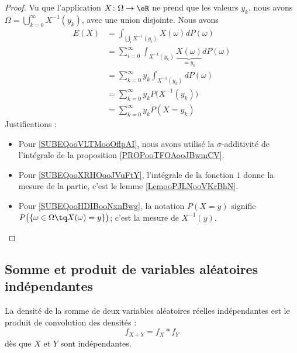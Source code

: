 \begin{proof}
	Vu que l'application \( X\colon \Omega\to \eR\) ne prend que les valeurs \( y_k\), nous avons \( \Omega=\bigcup_{k=0}^{\infty}X^{-1}(y_k)\), avec une union disjointe. Nous avons
	\begin{subequations}
		\begin{align}
			E(X) & =\int_{\bigcup_iX^{-1}(y_i)}X(\omega)dP(\omega)                                                                \\
			     & =\sum_{i=0}^{\infty}\int_{X^{-1}(y_k)}\underbrace{X(\omega)}_{=y_k}dP(\omega)      \label{SUBEQooVLTMooOflpAI} \\
			     & =\sum_{k=0}^{\infty}y_k\int_{X^{-1}(y_k)}dP(\omega)                                                            \\
			     & =\sum_{k=0}^{\infty}y_kP\big( X^{-1}(y_k) \big)        \label{SUBEQooXRHOooJVuFtY}                             \\
			     & =\sum_{k=0}^{\infty}y_kP(X=y_k)        \label{SUBEQooHDIBooNxnBwg}
		\end{align}
	\end{subequations}
	Justifications :
	\begin{itemize}
		\item
		      Pour \eqref{SUBEQooVLTMooOflpAI}, nous avons utilisé la \( \sigma\)-additivité de l'intégrale de la proposition \ref{PROPooTFOAooJBwmCV}.
		\item
		      Pour \eqref{SUBEQooXRHOooJVuFtY}, l'intégrale de la fonction \( 1\) donne la mesure de la partie, c'est le lemme \ref{LemooPJLNooVKrBhN}.
		\item
		      Pour \eqref{SUBEQooHDIBooNxnBwg}, la notation \( P(X=y)\) signifie \( P\big( \{ \omega\in \Omega \tq X(\omega)=y\}\big)\); c'est la mesure de \( X^{-1}(y)\).
	\end{itemize}
\end{proof}

\subsection{Somme et produit de variables aléatoires indépendantes}
\label{subsecscnvommevariablsindep}


\begin{proposition}		\label{PROPooBNUEooOUvpdp}
	La densité de la somme de deux variables aléatoires réelles indépendantes est le produit de convolution des densités :
	\begin{equation}
		f_{X+Y}=f_X* f_Y
	\end{equation}
	dès que \( X\) et \( Y\) sont indépendantes.
\end{proposition}

